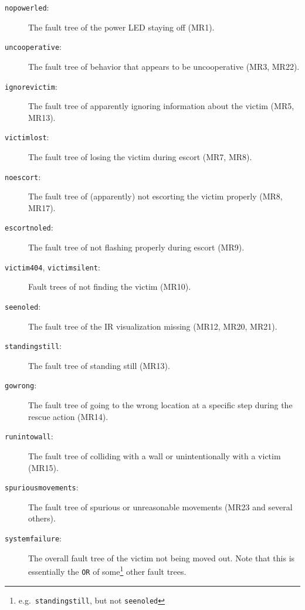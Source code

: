 \documentclass[a4paper,parskip,headheight=38pt]{scrartcl} %
\begin{document}
\begin{description}
\item[\texttt{nopowerled}:]
    The fault tree of the power LED staying off (MR1).
\item[\texttt{uncooperative}:]
    The fault tree of behavior that appears to be uncooperative (MR3, MR22).
\item[\texttt{ignorevictim}:]
    The fault tree of apparently ignoring information about the victim
    (MR5, MR13).
\item[\texttt{victimlost}:]
    The fault tree of losing the victim during escort (MR7, MR8).
\item[\texttt{noescort}:]
    The fault tree of (apparently) not escorting the victim properly
    (MR8, MR17).
\item[\texttt{escortnoled}:]
    The fault tree of not flashing properly during escort (MR9).
\item[\texttt{victim404}, \texttt{victimsilent}:]
    Fault trees of not finding the victim (MR10).
\item[\texttt{seenoled}:]
    The fault tree of the IR visualization missing (MR12, MR20, MR21).
\item[\texttt{standingstill}:]
    The fault tree of standing still (MR13).
\item[\texttt{gowrong}:]
    The fault tree of going to the wrong location at a specific step
    during the rescue action (MR14).
\item[\texttt{runintowall}:]
    The fault tree of colliding with a wall or unintentionally with a
    victim (MR15).
\item[\texttt{spuriousmovements}:]
    The fault tree of spurious or unreasonable movements (MR23 and
    several others).
\item[\texttt{systemfailure}:]
    The overall fault tree of the victim not being moved out.  Note
    that this is essentially the \texttt{OR} of some\footnote{e.g.\
    \texttt{standingstill}, but not \texttt{seenoled}} other fault
    trees.
\end{description}
\end{document}
